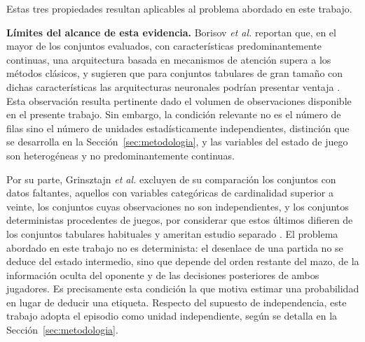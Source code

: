 Estas tres propiedades resultan aplicables al problema abordado en este
trabajo. 


\noindent\textbf{Límites del alcance de esta evidencia.} Borisov
\textit{et al.} reportan que, en el mayor de los conjuntos evaluados, con
características predominantemente continuas, una arquitectura basada en
mecanismos de atención supera a los métodos clásicos, y sugieren que para
conjuntos tabulares de gran tamaño con dichas características las
arquitecturas neuronales podrían presentar ventaja
\cite{borisov_tabular_2024}. Esta observación resulta pertinente dado el
volumen de observaciones disponible en el presente trabajo. Sin embargo, la
condición relevante no es el número de filas sino el número de unidades
estadísticamente independientes, distinción que se desarrolla en la
Sección~\ref{sec:metodologia}, y las variables del estado de juego son
heterogéneas y no predominantemente continuas.

Por su parte, Grinsztajn \textit{et al.} excluyen de su comparación los
conjuntos con datos faltantes, aquellos con variables categóricas de
cardinalidad superior a veinte, los conjuntos cuyas observaciones no son
independientes, y los conjuntos deterministas procedentes de juegos, por
considerar que estos últimos difieren de los conjuntos tabulares habituales
y ameritan estudio separado \cite{grinsztajn_trees_2022}. El problema
abordado en este trabajo no es determinista: el desenlace de una partida no
se deduce del estado intermedio, sino que depende del orden restante del
mazo, de la información oculta del oponente y de las decisiones
posteriores de ambos jugadores. Es precisamente esta condición la que
motiva estimar una probabilidad en lugar de deducir una etiqueta. Respecto
del supuesto de independencia, este trabajo adopta el episodio como unidad
independiente, según se detalla en la Sección~\ref{sec:metodologia}.


